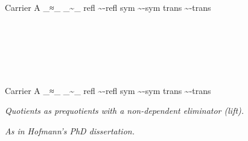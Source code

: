 \begin{code}\>\<%
\\
%
\\
%
\\
\>  \AgdaSymbol{(} \AgdaSymbol{:} \AgdaSymbol{)} \AgdaSymbol{:}  \<%
\\
\>[0]\<[2]%
\>[2]    \AgdaSymbol{(}Carrier  A\AgdaSymbol{;} \_≈\_  \_\textasciitilde\_ \AgdaSymbol{;} refl  \textasciitilde-refl\AgdaSymbol{;} sym  \textasciitilde-sym\AgdaSymbol{;} trans  \textasciitilde-trans\AgdaSymbol{)}\<%
\\
\>[0]\<[2]%
\>[2]\<%
\\
\>[2]\<[4]%
\>[4] \<[8]%
\>[8]\AgdaSymbol{:} \<%
\\
\>[2]\<[4]%
\>[4]\AgdaField{[\_]} \AgdaSymbol{:}   \<%
\\
\>[2]\<[4]%
\>[4] \AgdaSymbol{:} \AgdaBound{[\_]}  \AgdaFunction{\_\textasciitilde\_}\<%
\\
\>[2]\<[4]%
\>[4] \AgdaSymbol{:}  \<%
\\
%
\\
\>[0]\<[2]%
\>[2]     \AgdaSymbol{(}Carrier  A\AgdaSymbol{;} \_≈\_  \_\textasciitilde\_ \AgdaSymbol{;} refl  \textasciitilde-refl\AgdaSymbol{;} sym  \textasciitilde-sym\AgdaSymbol{;} trans  \textasciitilde-trans\AgdaSymbol{)}\<%
\\
\>\<\end{code}

\emph{Quotients as prequotients with a non-dependent eliminator (lift).}

\emph{As in Hofmann's PhD dissertation.}

